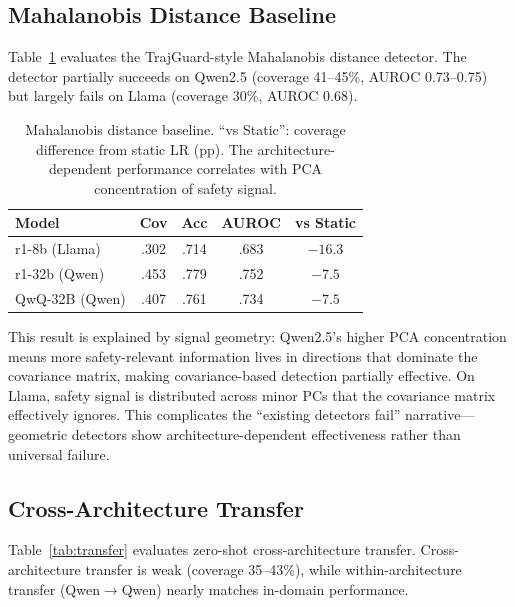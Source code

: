 \documentclass[11pt,a4paper]{article}
\begin{document}
\subsection{Mahalanobis Distance Baseline}
\label{sec:mahalanobis}

Table~\ref{tab:mahal} evaluates the TrajGuard-style Mahalanobis distance detector. The detector partially succeeds on Qwen2.5 (coverage 41--45\%, AUROC 0.73--0.75) but largely fails on Llama (coverage 30\%, AUROC 0.68).

\begin{table}[t]
\centering
\small
\begin{tabular}{lcccc}
\toprule
\textbf{Model} & \textbf{Cov} & \textbf{Acc} & \textbf{AUROC} & \textbf{vs Static} \\
\midrule
r1-8b (Llama) & .302 & .714 & .683 & $-16.3$ \\
r1-32b (Qwen) & .453 & .779 & .752 & $-7.5$ \\
QwQ-32B (Qwen) & .407 & .761 & .734 & $-7.5$ \\
\bottomrule
\end{tabular}
\caption{Mahalanobis distance baseline. ``vs Static'': coverage difference from static LR (pp). The architecture-dependent performance correlates with PCA concentration of safety signal.}
\label{tab:mahal}
\end{table}

This result is explained by signal geometry: Qwen2.5's higher PCA concentration means more safety-relevant information lives in directions that dominate the covariance matrix, making covariance-based detection partially effective. On Llama, safety signal is distributed across minor PCs that the covariance matrix effectively ignores. This complicates the ``existing detectors fail'' narrative---geometric detectors show architecture-dependent effectiveness rather than universal failure.

\subsection{Cross-Architecture Transfer}
\label{sec:transfer}

Table~\ref{tab:transfer} evaluates zero-shot cross-architecture transfer. Cross-architecture transfer is weak (coverage 35--43\%), while within-architecture transfer (Qwen$\to$Qwen) nearly matches in-domain performance.
\end{document}
